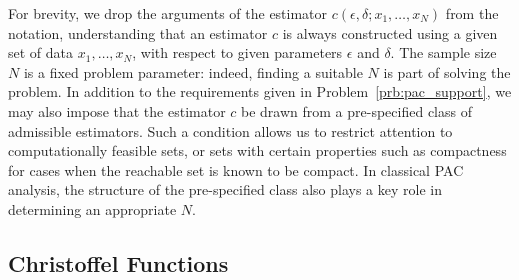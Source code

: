 \documentclass[onefignum,onetabnum]{siamart171218}
\begin{document}
For brevity, we drop the arguments of the estimator
$c(\epsilon,\delta;x_1,\dotsc,x_N)$ 
from the notation, understanding that an estimator $c$ is always constructed
using a given set of data $x_1,\dotsc,x_N$, with respect to given parameters
$\epsilon$ and $\delta$.
The sample size $N$ is a fixed problem parameter: indeed, finding a suitable $N$ is part of
solving the problem.
In addition to the requirements given in Problem~\ref{prb:pac_support}, 
we may also impose that the estimator $c$ be
drawn from a pre-specified class of admissible estimators. Such a condition
allows us to restrict attention to computationally feasible sets, or sets with
certain properties such as compactness for cases when the reachable set is known
to be compact.
In classical PAC analysis, the structure of the pre-specified class also
plays a key role in determining an appropriate $N$.

\subsection{Christoffel Functions}%
\label{sub:christoffel_functions}
\end{document}

